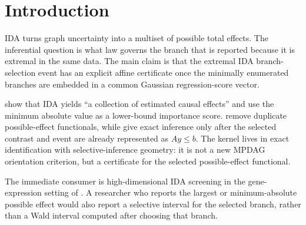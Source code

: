 \documentclass[11pt]{article}
\theoremstyle{definition}
\theoremstyle{plain}
\theoremstyle{remark}
\begin{document}
\section{Introduction}
IDA turns graph uncertainty into a multiset of possible total effects. The inferential question is what law governs the branch that is reported because it is extremal in the same data. The main claim is that the extremal IDA branch-selection event has an explicit affine certificate once the minimally enumerated branches are embedded in a common Gaussian regression-score vector.

\citet[Abstract, p.~3134]{MaathuisKalischBuhlmann2009IDA} show that IDA yields ``a collection of estimated causal effects'' and use the minimum absolute value as a lower-bound importance score. \citet[Abstract, p.~2395]{GuoPerkovic2021MinimalEnumeration} remove duplicate possible-effect functionals, while \citet[Theorem 5.2, p.~915]{LeeSunSunTaylor2016Polyhedral} give exact inference only after the selected contrast and event are already represented as \(Ay\le b\). The kernel lives in exact identification with selective-inference geometry: it is not a new MPDAG orientation criterion, but a certificate for the selected possible-effect functional.

The immediate consumer is high-dimensional IDA screening in the gene-expression setting of \citet{MaathuisKalischBuhlmann2009IDA}. A researcher who reports the largest or minimum-absolute possible effect would also report a selective interval for the selected branch, rather than a Wald interval computed after choosing that branch.
\end{document}
